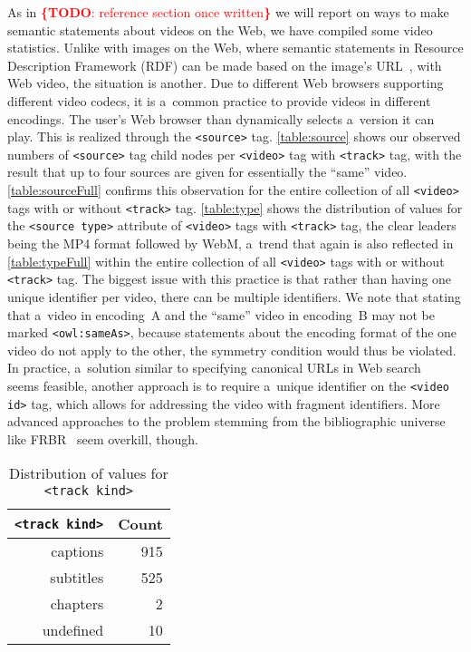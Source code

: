 \documentclass{sig-alternate}
\newcommand{\todo}[1]{\noindent\textcolor{red}{{\bf \{TODO}: #1{\bf \}}}}
\begin{document}
As in \todo{reference section once written}
we will report on ways to make semantic statements
about videos on the Web,
we have compiled some video statistics.
Unlike with images on the Web, where
semantic statements in
Resource Description Framework (RDF)
can be made based on the image's
URL~\cite{linsley2009rdfa},
with Web video, the situation is another.
Due to different Web browsers supporting
different video codecs,
it is a~common practice to provide videos
in different encodings.
The user's Web browser than dynamically selects
a~version it can play.
This is realized through the \texttt{<source>} tag.
\autoref{table:source} shows our observed numbers of
\texttt{<source>} tag child nodes per
\texttt{<video>} tag with \texttt{<track>} tag,
with the result that up to
four sources are given for essentially the ``same'' video.
\autoref{table:sourceFull} confirms this observation
for the entire collection of all \texttt{<video>} tags
with or without \texttt{<track>} tag.
\autoref{table:type} shows the distribution
of values for the \texttt{<source type>} attribute
of \texttt{<video>} tags with \texttt{<track>} tag,
the clear leaders being the MP4 format
followed by WebM,
a~trend that again is also reflected
in \autoref{table:typeFull}
within the entire collection
of all \texttt{<video>} tags
with or without \texttt{<track>} tag.
The biggest issue with this practice is that
rather than having one unique identifier per video,
there can be multiple identifiers.
We note that stating that a~video in encoding~A
and the ``same'' video in encoding~B
may not be marked \texttt{<owl:sameAs>},
because statements about the encoding format
of the one video do not apply to the other,
the symmetry condition would thus be violated.
In practice, a~solution similar to
specifying canonical URLs in Web search%
~\cite{kupke2009canonical} seems feasible,
another approach is to require a~unique identifier
on the \texttt{<video id>} tag,
which allows for addressing the video
with fragment identifiers.
More advanced approaches to the problem
stemming from the bibliographic universe
like FRBR~\cite{tillett2004frbr} seem overkill, though.

\begin{table}[p]
  \centering
  \begin{tabular}{ r | r }                       
    \texttt{<track kind>} & Count \\
    \hline  
    captions & 915\\
    subtitles & 525\\
    chapters & 2\\
    undefined & 10\\  
  \end{tabular}
  \caption{Distribution of values for
    \texttt{<track kind>}}
  \label{table:kind}
\end{table}
\end{document}
